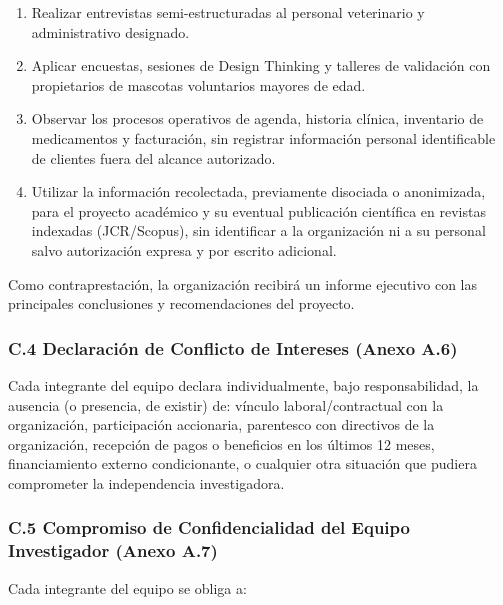 \documentclass[
]{article}
\begin{document}
\begin{enumerate}
  \item Realizar entrevistas semi-estructuradas al personal veterinario y administrativo designado.
  \item Aplicar encuestas, sesiones de Design Thinking y talleres de validación con propietarios de mascotas voluntarios mayores de edad.
  \item Observar los procesos operativos de agenda, historia clínica, inventario de medicamentos y facturación, sin registrar información personal identificable de clientes fuera del alcance autorizado.
  \item Utilizar la información recolectada, previamente disociada o anonimizada, para el proyecto académico y su eventual publicación científica en revistas indexadas (JCR/Scopus), sin identificar a la organización ni a su personal salvo autorización expresa y por escrito adicional.
\end{enumerate}

Como contraprestación, la organización recibirá un informe ejecutivo con las principales conclusiones y recomendaciones del proyecto.

\subsubsection{C.4 Declaración de Conflicto de Intereses (Anexo A.6)}\label{c4-conflicto-intereses}

Cada integrante del equipo declara individualmente, bajo responsabilidad, la ausencia (o presencia, de existir) de: vínculo laboral/contractual con la organización, participación accionaria, parentesco con directivos de la organización, recepción de pagos o beneficios en los últimos 12 meses, financiamiento externo condicionante, o cualquier otra situación que pudiera comprometer la independencia investigadora.

\subsubsection{C.5 Compromiso de Confidencialidad del Equipo Investigador (Anexo A.7)}\label{c5-compromiso-confidencialidad}

Cada integrante del equipo se obliga a:
\end{document}

